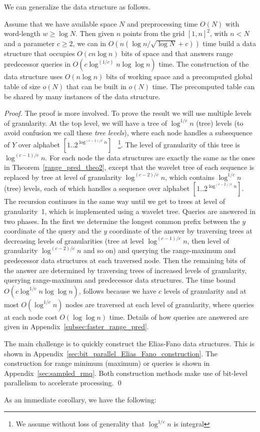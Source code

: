 \documentclass[11pt,runningheads]{llncs}
\begin{document}
We can generalize the data structure as follows. 

\begin{theorem}
\label{range_pred_theo2}
Assume that we have available space $N$ 
and preprocessing time $O(N)$ with word-length 
$w\geq \log N$. Then given $n$ points from the grid $[1,n]^2$, 
with $n<N$ and a parameter $c\geq 2$, we can in $O(n(\log n/\sqrt{\log N}+c))$ time build 
a data structure that occupies $O(cn\log n)$ bits of space and that answers range predecessor 
queries in $O(c\log^{(1/c)} n\log\log n)$ time. 
The construction of the data structure uses $O(n\log n)$ bits of working space 
and a precomputed global table 
of size $o(N)$ that can be built in $o(N)$ time. The precomputed table can be shared 
by many instances of the data structure. 
\end{theorem}
\begin{proof}
The proof is more involved. To prove the result we will use multiple levels 
of granularity. 
At the top level, we will have a tree of $\log^{1/c}n$ (tree) levels
(to avoid confusion we call these {\em tree levels}), where 
each node handles a subsequence of $Y$ over alphabet $[1..2^{\log^{(c-1)/c}n}]$
~\footnote{We assume without loss of generality that 
$\log^{1/c}n$ is integral}. 
The level of granularity of this tree is $\log^{(c-1)/c}n$. 
For each node the data structures are exactly the same as the ones in Theorem~\ref{range_pred_theo2}, 
except that the wavelet tree of each sequence is replaced by tree at level of granularity 
$\log^{(c-2)/c}n$, which contains $\log^{1/c}n$ (tree) levels, 
each of which handles a sequence over alphabet $[1..2^{\log^{(c-2)/c}n}]$. 
The recursion continues in the same way until we get to trees at level of granularity~1, 
which is implemented using a wavelet tree. 
Queries are answered in two phases. In the first we determine the longest common 
prefix between the $y$ coordinate of the query and the $y$ coordinate of the answer 
by traversing trees at decreasing levels of granularities
(tree at level $\log^{(c-1)/c}n$, then level of granularity $\log^{(c-2)/c}n$ and so on)
and querying the range-maximum and predecessor data structures at each traversed node. 
Then the remaining bits of the answer are determined by traversing trees of increased levels 
of granularity, querying range-maximum and predecessor data structures. 
The time bound $O(c\log^{1/c}n\log\log n)$, follows because we have 
$c$ levels of granularity and at most $O(\log^{1/c} n)$
nodes are traversed at each level of granularity, where queries at each node 
cost $O(\log\log n)$ time.
Details of how queries are answered are given in Appendix~\ref{subsec:faster_range_pred}.

The main challenge is to quickly construct the Elias-Fano data structures. This 
is shown in Appendix~\ref{sec:bit_parallel_Elias_Fano_construction}. 
The construction for range minimum (maximum) 
or queries is shown in Appendix~\ref{sec:sampled_rmq}. 
Both construction methods make use of bit-level parallelism 
to accelerate processing. 
\qed
\end{proof}
As an immediate corollary, we have the following: 
\end{document}
